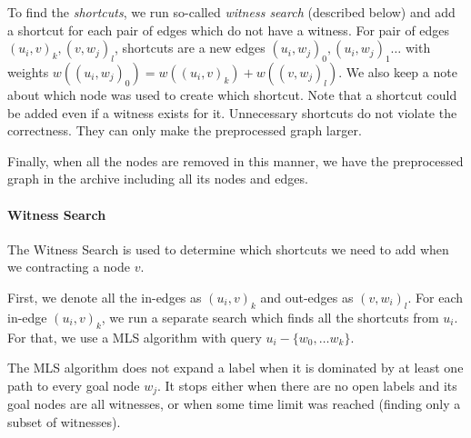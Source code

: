To find the {\em shortcuts}, we run so-called {\em witness search} (described
below) and add a shortcut for each pair of edges which do not have a witness.
For pair of edges $(u_i,v)_k,(v,w_j)_l$, shortcuts are a new edges $(u_i,w_j)_0, (u_i,w_j)_1 \dots$ 
with weights $w((u_i,w_j)_0) = w((u_i,v)_k)+w((v,w_j)_l)$. 
We also keep a note about which node was used to create which
shortcut.
Note that a shortcut could be added even if a witness exists for it. Unnecessary shortcuts do not violate the correctness. They can only make the preprocessed graph larger.


Finally, when all the nodes are removed in this manner, we have the preprocessed graph in the archive including all its nodes and edges.

\paragraph*{Witness Search}
The Witness Search is used to determine which shortcuts we need to add when we contracting a node $v$. 

First, we denote all the in-edges as $(u_i,v)_k$ and out-edges as $(v,w_i)_l$. For each in-edge $(u_i,v)_k$, we run a separate search which finds all the shortcuts from $u_i$. For that, we use a MLS algorithm with query $u_i-\{w_0,\dots w_k\}$. 

The MLS algorithm does not expand a label when it is dominated by at least one path to every goal node $w_j$. It stops either when there are no open labels and its goal nodes are all witnesses,
or when some time limit was reached (finding only a subset of witnesses). 


